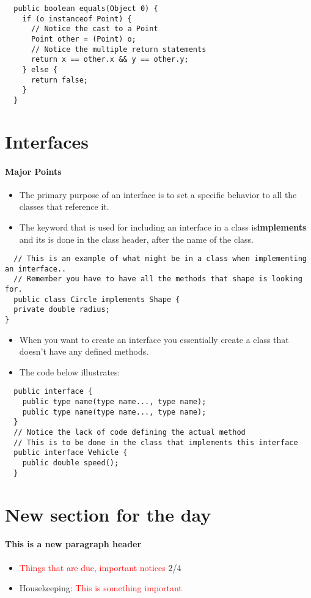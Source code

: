 \documentclass{article}
\begin{document}
\begin{lstlisting}
  public boolean equals(Object 0) {
    if (o instanceof Point) {
      // Notice the cast to a Point
      Point other = (Point) o;
      // Notice the multiple return statements
      return x == other.x && y == other.y;
    } else {
      return false;
    }
  }
\end{lstlisting}
\pagebreak
\section{Interfaces}
\paragraph{Major Points}

\begin{itemize}
  \item The primary purpose of an interface is to set a specific behavior to
  all the classes that reference it. 
  \item The keyword that is used for including an interface in a class
  is\textbf{implements} and its is done in the class header, after the name of
  the class.
\end{itemize}

\begin{lstlisting}
  // This is an example of what might be in a class when implementing an interface..
  // Remember you have to have all the methods that shape is looking for.
  public class Circle implements Shape {
  private double radius;
}
\end{lstlisting}

\begin{itemize}
  \item When you want to create an interface you essentially create a class that
  doesn't have any defined methods.
  \item The code below illustrates:
\end{itemize}

\begin{lstlisting}
  public interface { 
    public type name(type name..., type name);
    public type name(type name..., type name);
  }
  // Notice the lack of code defining the actual method
  // This is to be done in the class that implements this interface
  public interface Vehicle {
    public double speed();
  }
\end{lstlisting}

\section{New section for the day}
\paragraph{This is a new paragraph header}

\begin{itemize}
  \item \textcolor{red}{Things that are due, important notices} 2/4
  \item Housekeeping: \textcolor{red}{This is something important}
\end{itemize}
\end{document}
